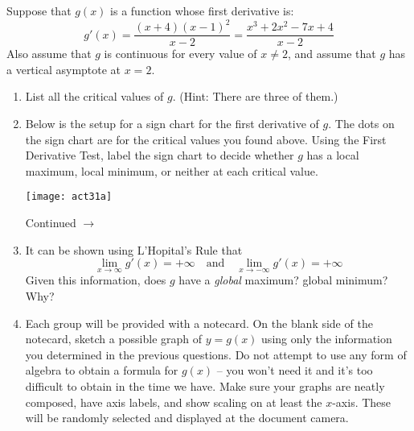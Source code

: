 \documentclass[11pt]{article}
\def\ra{\rightarrow}
\def\pageturn{\vfill 
\begin{flushright}
	\begin{small}
		Continued $\ra$
	\end{small}
\end{flushright} \newpage}
\begin{document}
Suppose that $g(x)$ is a function whose first derivative is: 
\[ g'(x) = \frac{(x+4)(x-1)^2}{x-2} = \frac{x^3+2 x^2-7 x+4}{x-2}\]
Also assume that $g$ is continuous for every value of $x \neq 2$, and assume that $g$ has a vertical asymptote at $x = 2$. 

\begin{enumerate}
	\item List all the critical values of $g$. (Hint: There are three of them.) 
	\vspace{0.5in}
	
	
	\item Below is the setup for a sign chart for the first derivative of $g$. The dots on the sign chart are for the critical values you found above. Using the First Derivative Test, label the sign chart to decide whether $g$ has a local maximum, local minimum, or neither at each critical value. 
	
	\bigskip
	
		\texttt{[image: act31a]}

% 	
\pageturn

	\item It can be shown using L'Hopital's Rule that 
	\[ \lim_{x \to \infty} g'(x) = +\infty \quad \text{and} \quad \lim_{x \to -\infty} g'(x) = +\infty\]
Given this information, does $g$ have a \emph{global} maximum? global minimum? Why?
	
	\vspace{0.5in}
	
	\item Each group will be provided with a notecard. On the blank side of the notecard, sketch a possible graph of  $y = g(x)$ using only the information you determined in the previous questions. Do not attempt to use any form of algebra to obtain a formula for $g(x)$ -- you won't need it and it's too difficult to obtain in the time we have. Make sure your graphs are neatly composed, have axis labels, and show scaling on at least the $x$-axis. These will be randomly selected and displayed at the document camera. 
	
	
\end{enumerate}
\end{document}

